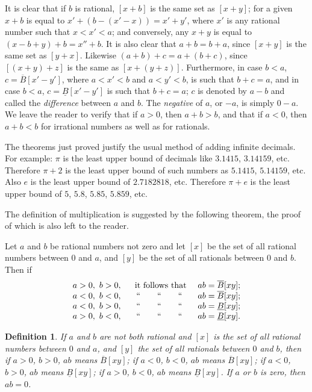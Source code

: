 \documentclass[a4paper,12pt]{book}[2004/02/16]
\theoremstyle{ilemma}
\theoremstyle{itheorem}
\theoremstyle{iother}
\theoremstyle{icorollary}
\theoremstyle{numcorollary}
\theoremstyle{idefinition}
\newtheorem*{definition}{Definition}
\begin{document}
It is clear that if $b$ is rational, $[x+b]$ is the same set as
$[x+y]$; for a given $x+b$ is equal to $x'+(b-(x'-x))=x'+y'$, where
$x'$ is any rational number such that $x<x'<a$; and conversely, any
$x+y$ is equal to $(x-b+y)+b=x''+b$. It is also clear that $a+b=b+a$,
since $[x+y]$ is the same set as $[y+x]$. Likewise $(a+b)+c=a+(b+c)$,
since $[(x+y)+z]$ is the same as $[x+(y+z)]$.  Furthermore, in case
$b<a$, $c=\overline{B}[x'-y']$, where $a<x'<b$ and $a<y'<b$, is such
that $b+c=a$, and in case $b<a$, $c=\underline{B}[x'-y']$ is such that
$b+c=a$; $c$ is denoted by $a-b$ and called the \emph{difference}
between $a$ and $b$. The \emph{negative} of $a$, or $-a$, is simply
$0-a$.  We leave the reader to verify that if $a>0$, then $a+b>b$, and
that if $a<0$, then $a+b<b$ for irrational numbers as well as for
rationals.

The theorems just proved justify the usual method of adding
infinite decimals. For example: $\pi$ is the least upper bound
of decimals like $3.1415$, $3.14159$, etc. Therefore $\pi+2$ is the
least upper bound of such numbers as $5.1415$, $5.14159$, etc.
Also $e$ is the least upper bound of $2.7182818$, etc. Therefore
$\pi+e$ is the least upper bound of $5$, $5.8$, $5.85$, $5.859$, etc.

The definition of multiplication is suggested by the following
theorem, the proof of which is also left to the reader.

Let $a$ and $b$ be rational numbers not zero and let $[x]$ be the
set of all rational numbers between $0$ and $a$, and $[y]$ be the set
of all rationals between $0$ and $b$. Then if
\[
\begin{array}{cccccc}
a>0,\ b>0, &\text{\ \ it\ follows\ that\ }&ab=\overline{B}[xy];\\
a<0,\ b<0, &``\hspace{2em}``\hspace{2em}``&ab=\overline{B}[xy];\\
a<0,\ b>0, &``\hspace{2em}``\hspace{2em}``&ab=\underline{B}[xy];\\
a>0,\ b<0, &``\hspace{2em}``\hspace{2em}``&ab=\underline{B}[xy].
\end{array}
\]

\begin{definition}
If $a$ and $b$ are not both rational and $[x]$ is the
set of all rational numbers between $0$ and $a$, and $[y]$ the set of
all rationals between $0$ and $b$, then if $a>0$, $b>0$, $ab$ means
$\overline{B}[xy]$; if $a<0$, $b<0$, $ab$ means $\overline{B}[xy]$; if
$a<0$, $b>0$, $ab$ means $\underline{B}[xy]$; if $a>0$, $b<0$, $ab$
means $\underline{B}[xy]$. If $a$ or $b$ is zero, then $ab=0$.
\end{definition}
\end{document}

